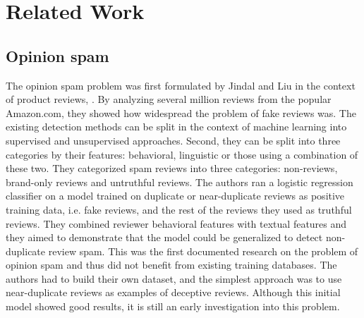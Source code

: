 \chapter{Related Work}
\label{chapter:relatedwork}

\section{Opinion spam}\label{section:opinion-spam}

The opinion spam problem was first formulated by Jindal and Liu in the context of product reviews, \citet{Jindal2008}. By analyzing several million reviews from the popular Amazon.com, they showed how widespread the problem of fake reviews was. The existing detection methods can be split in the context of machine learning into supervised and unsupervised approaches. Second, they can be split into three categories by their features: behavioral, linguistic or those using a combination of these two.
They categorized spam reviews into three categories: non-reviews, brand-only reviews and untruthful reviews. The authors ran a logistic regression classifier on a model trained on duplicate or near-duplicate reviews as positive training data, i.e. fake reviews, and the rest of the reviews they used as truthful reviews. They combined reviewer behavioral features with textual features and they aimed to demonstrate that the model could be generalized to detect non-duplicate review spam. This was the first documented research on the problem of opinion spam and thus did not benefit from existing training databases. The authors had to build their own dataset, and the simplest approach was to use near-duplicate reviews as examples of deceptive reviews. Although this initial model showed good results, it is still an early investigation into this problem.

